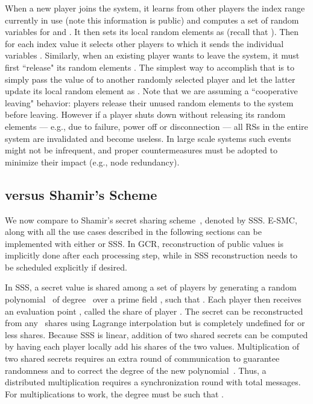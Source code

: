 \documentclass{sig-alternate}
\begin{document}
When a new player   joins the system, it learns from other players the index range currently in use  (note this information is public) and computes a set of random variables  for  and . It then sets its local random elements as  (recall that ). Then for each index value  it selects  other players to which it sends the individual variables . 
Similarly, when an existing player   wants to leave the system, it must first ``release" its random elements  . 
The simplest way to accomplish that is to simply pass the value of  to another randomly selected player  and let the latter update its local random element as . 
Note that we are assuming a ``cooperative leaving" behavior: players release their unused random elements to the system before leaving. 
However if a player shuts down without releasing its random elements --- e.g., due to failure, power off or disconnection ---  all RSs in the entire system are invalidated and become useless. In large scale systems such events might not be infrequent, and proper countermeasures must be adopted to minimize their impact (e.g., node redundancy). 

\subsection{\ata versus Shamir's Scheme}\label{sec:comparison-ata-sss}

We now compare \ata to Shamir's secret sharing scheme~\cite{shamir79}, denoted by SSS.
E-SMC, along with all the use cases described in the following sections 
can be implemented with either \ata or SSS. 
In GCR, reconstruction of public values is implicitly done after each processing step, while in SSS reconstruction needs to be scheduled explicitly if desired.

In SSS, a secret value  is shared among a set of  players by generating a random
polynomial~ of degree~ over a prime field , such that .  Each player  then receives an evaluation
point , called the share of player . The secret  can be reconstructed from any~ shares using Lagrange interpolation but is completely undefined for
 or less shares. 
Because SSS is linear, addition of two shared secrets can be computed by having each player locally add his shares of the two values.
Multiplication of two shared secrets requires an extra round of communication to guarantee randomness and to correct the degree of the
new polynomial~\cite{gennaro1998sva}. Thus, a distributed multiplication requires a synchronization round with  total messages. For multiplications to work, the
degree must be such that .
\end{document}
